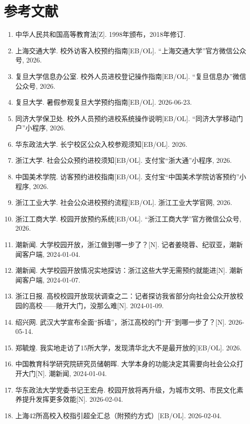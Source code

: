 \documentclass[12pt]{article}
\begin{document}
\newpage
\section*{参考文献}

\begin{enumerate}[leftmargin=2em]
    \item 中华人民共和国高等教育法[Z]. 1998年颁布，2018年修订.

    \item 上海交通大学. 校外访客入校预约指南[EB/OL]. “上海交通大学”官方微信公众号, 2026.
    \item 复旦大学信息办公室. 校外人员进校登记操作指南[EB/OL]. “复旦信息办”微信公众号, 2026.
    \item 复旦大学. 暑假参观复旦大学预约指南[EB/OL]. 2026-06-23.
    \item 同济大学保卫处. 校外人员预约进校系统操作说明[EB/OL]. “同济大学移动门户”小程序, 2026.
    \item 华东政法大学. 长宁校区公众入校参观须知[EB/OL]. 2026.

    \item 浙江大学. 社会公众预约进校须知[EB/OL]. 支付宝“浙大通”小程序, 2026.
    \item 中国美术学院. 访客预约进校指南[EB/OL]. 支付宝“中国美术学院访客预约”小程序, 2026.
    \item 浙江工业大学. 社会公众进校预约流程[EB/OL]. 浙江工业大学官网, 2026.
    \item 浙江工商大学. 校园开放预约系统[EB/OL]. “浙江工商大学”官方微信公众号, 2026.

    \item 潮新闻. 大学校园开放，浙江做到哪一步了？[N]. 记者姜晓蓉、纪驭亚，潮新闻客户端, 2024-01-04.
    \item 潮新闻. 大学校园开放情况实地探访：浙江这些大学无需预约就能进[N]. 潮新闻客户端, 2024-01-07.
    \item 浙江日报. 高校校园开放现状调查之二：记者探访我省部分向社会公众开放校园的高校——敞开大门，没那么难[N]. 2024-01-09.
    \item 绍兴网. 武汉大学宣布全面“拆墙”，浙江高校的门“开”到哪一步了？[N]. 2026-05-14.

    \item 郑毓煌. 我实地走访了15所大学，发现清华北大不是最开放的[EB/OL]. 2026.
    \item 中国教育科学研究院研究员储朝晖. 大学本身的功能决定其需要向社会公众打开大门[N]. 潮新闻, 2024-01-04.
    \item 华东政法大学党委书记王宏舟. 校园开放将再升级，为城市文明、市民文化素养提升发挥更多效能[N]. 2026-02-04.
    \item 上海42所高校入校指引超全汇总（附预约方式）[EB/OL]. 2026-02-04.
\end{enumerate}
\end{document}
